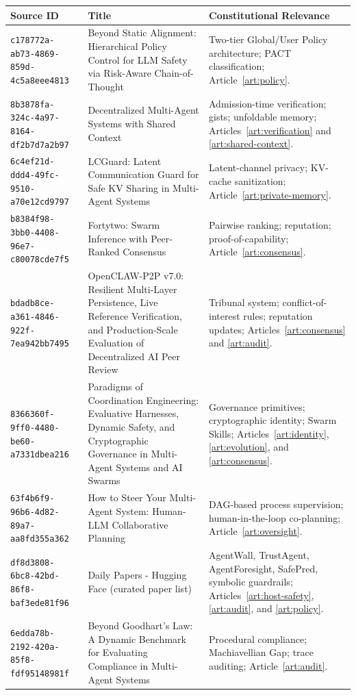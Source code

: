 \documentclass[12pt,letterpaper]{article}
\begin{document}
\begin{longtable}{|p{3cm}|p{5cm}|p{5.5cm}|}
\hline
\textbf{Source ID} & \textbf{Title} & \textbf{Constitutional Relevance} \\
\hline
\endhead
\texttt{c178772a-ab73-4869-859d-4c5a8eee4813} & Beyond Static Alignment: Hierarchical Policy Control for LLM Safety via Risk-Aware Chain-of-Thought & Two-tier Global/User Policy architecture; PACT classification; Article~\ref{art:policy}. \\
\hline
\texttt{8b3878fa-324c-4a97-8164-df2b7d7a2b97} & Decentralized Multi-Agent Systems with Shared Context & Admission-time verification; gists; unfoldable memory; Articles~\ref{art:verification} and \ref{art:shared-context}. \\
\hline
\texttt{6c4ef21d-ddd4-49fc-9510-a70e12cd9797} & LCGuard: Latent Communication Guard for Safe KV Sharing in Multi-Agent Systems & Latent-channel privacy; KV-cache sanitization; Article~\ref{art:private-memory}. \\
\hline
\texttt{b8384f98-3bb0-4408-96e7-c80078cde7f5} & Fortytwo: Swarm Inference with Peer-Ranked Consensus & Pairwise ranking; reputation; proof-of-capability; Article~\ref{art:consensus}. \\
\hline
\texttt{bdadb8ce-a361-4846-922f-7ea942bb7495} & OpenCLAW-P2P v7.0: Resilient Multi-Layer Persistence, Live Reference Verification, and Production-Scale Evaluation of Decentralized AI Peer Review & Tribunal system; conflict-of-interest rules; reputation updates; Articles~\ref{art:consensus} and \ref{art:audit}. \\
\hline
\texttt{8366360f-9ff0-4480-be60-a7331dbea216} & Paradigms of Coordination Engineering: Evaluative Harnesses, Dynamic Safety, and Cryptographic Governance in Multi-Agent Systems and AI Swarms & Governance primitives; cryptographic identity; Swarm Skills; Articles~\ref{art:identity}, \ref{art:evolution}, and \ref{art:consensus}. \\
\hline
\texttt{63f4b6f9-96b6-4d82-89a7-aa8fd355a362} & How to Steer Your Multi-Agent System: Human-LLM Collaborative Planning & DAG-based process supervision; human-in-the-loop co-planning; Article~\ref{art:oversight}. \\
\hline
\texttt{df8d3808-6bc8-42bd-86f8-baf3ede81f96} & Daily Papers - Hugging Face (curated paper list) & AgentWall, TrustAgent, AgentForesight, SafePred, symbolic guardrails; Articles~\ref{art:host-safety}, \ref{art:audit}, and \ref{art:policy}. \\
\hline
\texttt{6edda78b-2192-420a-85f8-fdf95148981f} & Beyond Goodhart's Law: A Dynamic Benchmark for Evaluating Compliance in Multi-Agent Systems & Procedural compliance; Machiavellian Gap; trace auditing; Article~\ref{art:audit}. \\

\end{longtable}
\end{document}

